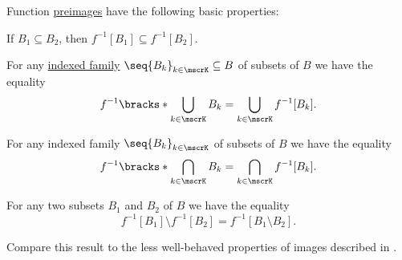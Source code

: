 \begin{proposition}\label{thm:def:function_preimage/properties}
  Function \hyperref[thm:def:function/properties/preimage]{preimages} have the following basic properties:
  \begin{thmenum}
     If \( B_1 \subseteq B_2 \), then \( f^{-1}[B_1] \subseteq f^{-1}[B_2] \).

     For any \hyperref[def:cartesian_product/indexed_family]{indexed family} \( \seq{ B_k }_{k \in \mscrK} \subseteq B \) of subsets of \( B \) we have the equality
    \begin{equation}\label{eq:thm:def:function_preimage/properties/union}
      f^{-1}\bracks*{ \bigcup_{k \in \mscrK} B_k } = \bigcup_{k \in \mscrK} f^{-1}[B_k].
    \end{equation}

     For any indexed family \( \seq{ B_k }_{k \in \mscrK} \) of subsets of \( B \) we have the equality
    \begin{equation}\label{eq:thm:def:function_preimage/properties/intersection}
      f^{-1}\bracks*{ \bigcap_{k \in \mscrK} B_k } = \bigcap_{k \in \mscrK} f^{-1}[B_k].
    \end{equation}

     For any two subsets \( B_1 \) and \( B_2 \) of \( B \) we have the equality
    \begin{equation}\label{eq:thm:def:function_preimage/properties/difference}
      f^{-1}[B_1] \setminus f^{-1}[B_2] = f^{-1}[B_1 \setminus B_2].
    \end{equation}
  \end{thmenum}

  Compare this result to the less well-behaved properties of images described in .
\end{proposition}
